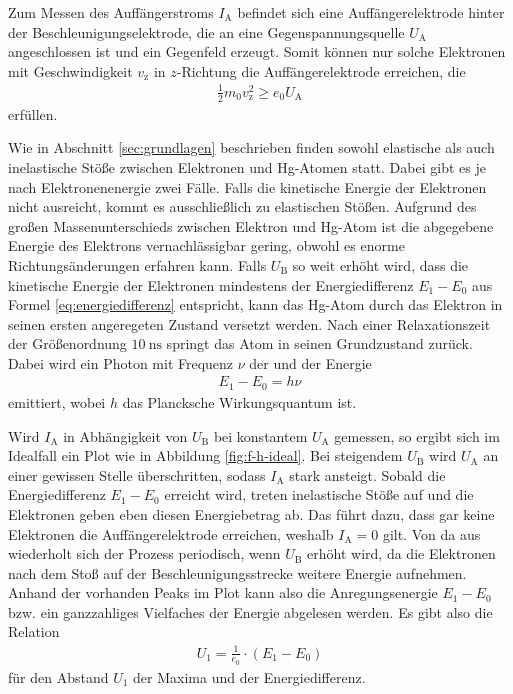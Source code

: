 \noindent
Zum Messen des Auffängerstroms $I_\text{A}$ befindet sich eine Auffängerelektrode hinter der Beschleunigungselektrode,
die an eine Gegenspannungsquelle $U_\text{A}$ angeschlossen ist und ein Gegenfeld erzeugt.
Somit können nur solche Elektronen mit Geschwindigkeit $v_\text{z}$ in $z$-Richtung die Auffängerelektrode erreichen, die 
\begin{align}
    \frac{1}{2} m_0 v^2_\text{z} \geq e_0 U_\text{A}
    \label{eq:v-kriterium}
\end{align}
erfüllen.

\noindent
Wie in Abschnitt \ref{sec:grundlagen} beschrieben finden sowohl elastische als auch inelastische Stöße zwischen Elektronen und Hg-Atomen statt.
Dabei gibt es je nach Elektronenenergie zwei Fälle.
Falls die kinetische Energie der Elektronen nicht ausreicht, kommt es ausschließlich zu elastischen Stößen.
Aufgrund des großen Massenunterschieds zwischen Elektron und Hg-Atom ist die abgegebene Energie des Elektrons vernachlässigbar gering,
obwohl es enorme Richtungsänderungen erfahren kann.
Falls $U_\text{B}$ so weit erhöht wird, 
dass die kinetische Energie der Elektronen mindestens der Energiedifferenz $E_1 - E_0$ aus Formel \eqref{eq:energiedifferenz} entspricht,
kann das Hg-Atom durch das Elektron in seinen ersten angeregeten Zustand versetzt werden.
Nach einer Relaxationszeit der Größenordnung $\qty{10}{\nano\second}$ springt das Atom in seinen Grundzustand zurück.
Dabei wird ein Photon mit Frequenz $\nu$ der und der Energie 
\begin{align}
    E_1 - E_0 = h \nu
    \label{eq:photon}
\end{align}
emittiert, wobei $h$ das Plancksche Wirkungsquantum ist.

\noindent
Wird $I_\text{A}$ in Abhängigkeit von $U_\text{B}$ bei konstantem $U_\text{A}$ gemessen, 
so ergibt sich im Idealfall ein Plot wie in Abbildung \ref{fig:f-h-ideal}.
Bei steigendem $U_\text{B}$ wird $U_\text{A}$ an einer gewissen Stelle überschritten, sodass $I_\text{A}$ stark ansteigt.
Sobald die Energiedifferenz $E_1 - E_0$ erreicht wird, treten inelastische Stöße auf und die Elektronen geben eben diesen Energiebetrag ab.
Das führt dazu, dass gar keine Elektronen die Auffängerelektrode erreichen, weshalb $I_\text{A} = 0$ gilt.
Von da aus wiederholt sich der Prozess periodisch, wenn $U_\text{B}$ erhöht wird, da die Elektronen nach dem Stoß auf der Beschleunigungsstrecke weitere Energie aufnehmen. 
Anhand der vorhanden Peaks im Plot kann also die Anregungsenergie $E_1 - E_0$ bzw. ein ganzzahliges Vielfaches der Energie abgelesen werden.
Es gibt also die Relation 
\begin{align}
    U_1 = \frac{1}{e_0} \cdot \left(E_1 - E_0\right)
\end{align}
für den Abstand $U_1$ der Maxima und der Energiedifferenz.

